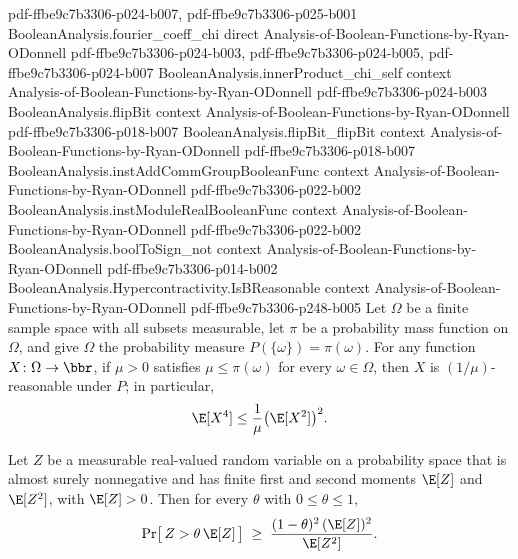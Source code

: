\begin{lemma}
  {pdf-ffbe9c7b3306-p024-b007,
    pdf-ffbe9c7b3306-p025-b001}
\proofstep
  {BooleanAnalysis.fourier_coeff_chi}
  {direct}
  {Analysis-of-Boolean-Functions-by-Ryan-ODonnell}
  {pdf-ffbe9c7b3306-p024-b003,
    pdf-ffbe9c7b3306-p024-b005,
    pdf-ffbe9c7b3306-p024-b007}
\proofstep
  {BooleanAnalysis.innerProduct_chi_self}
  {context}
  {Analysis-of-Boolean-Functions-by-Ryan-ODonnell}
  {pdf-ffbe9c7b3306-p024-b003}
\proofstep
  {BooleanAnalysis.flipBit}
  {context}
  {Analysis-of-Boolean-Functions-by-Ryan-ODonnell}
  {pdf-ffbe9c7b3306-p018-b007}
\proofstep
  {BooleanAnalysis.flipBit_flipBit}
  {context}
  {Analysis-of-Boolean-Functions-by-Ryan-ODonnell}
  {pdf-ffbe9c7b3306-p018-b007}
\proofstep
  {BooleanAnalysis.instAddCommGroupBooleanFunc}
  {context}
  {Analysis-of-Boolean-Functions-by-Ryan-ODonnell}
  {pdf-ffbe9c7b3306-p022-b002}
\proofstep
  {BooleanAnalysis.instModuleRealBooleanFunc}
  {context}
  {Analysis-of-Boolean-Functions-by-Ryan-ODonnell}
  {pdf-ffbe9c7b3306-p022-b002}
\proofstep
  {BooleanAnalysis.boolToSign_not}
  {context}
  {Analysis-of-Boolean-Functions-by-Ryan-ODonnell}
  {pdf-ffbe9c7b3306-p014-b002}
\proofstep
  {BooleanAnalysis.Hypercontractivity.IsBReasonable}
  {context}
  {Analysis-of-Boolean-Functions-by-Ryan-ODonnell}
  {pdf-ffbe9c7b3306-p248-b005}
\label{BooleanAnalysis.Hypercontractivity.min_prob_b_reasonable}
Let $\Omega$ be a finite sample space with all subsets measurable, let $\pi$ be a
probability mass function on $\Omega$, and give $\Omega$ the probability measure
$P(\{\omega\})=\pi(\omega)$. For any function $X\colon\Omega\to\bbr$, if $\mu > 0$
satisfies $\mu \le \pi(\omega)$ for every $\omega \in \Omega$, then $X$ is
$(1/\mu)$-reasonable under $P$; in particular,
\[
\E[X^4] \le \frac{1}{\mu}\bigl(\E[X^2]\bigr)^2 .
\]
\end{lemma}

\begin{lemma}
\leanok
{}
\label{BooleanAnalysis.Hypercontractivity.paley_zygmund_ineq}
Let $Z$ be a measurable real-valued random variable on a probability space that is
almost surely
nonnegative and has finite first and second moments $\E[Z]$ and $\E[Z^2]$, with $\E[Z] >
0$. Then for every $\theta$ with $0 \le \theta \le 1$,
\[
\Pr\bigl[\, Z > \theta\,\E[Z] \,\bigr] \;\ge\; \frac{(1-\theta)^2\,(\E[Z])^2}{\E[Z^2]}.
\]
\end{lemma}

